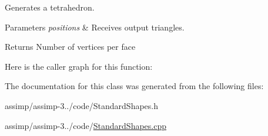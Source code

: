 Generates a tetrahedron. 


\begin{DoxyParams}{Parameters}
{\em positions} & Receives output triangles. \\
\hline
\end{DoxyParams}
\begin{DoxyReturn}{Returns}
Number of vertices per face 
\end{DoxyReturn}


Here is the caller graph for this function\+:




The documentation for this class was generated from the following files\+:\begin{DoxyCompactItemize}
\item 
assimp/assimp-\/3../code/Standard\+Shapes.\+h\item 
assimp/assimp-\/3../code/\hyperlink{_standard_shapes_8cpp}{Standard\+Shapes.\+cpp}\end{DoxyCompactItemize}
